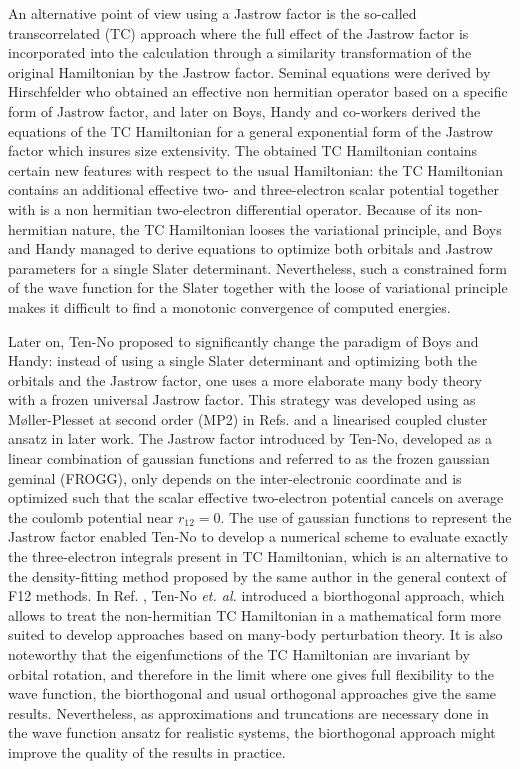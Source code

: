 \documentclass[aip,jcp,reprint,noshowkeys,superscriptaddress,twocolumn]{revtex4-1}
\begin{document}
An alternative point of view using a Jastrow factor is the so-called transcorrelated (TC) approach where the full effect of the Jastrow factor is incorporated into the calculation through a similarity transformation of the original Hamiltonian by the Jastrow factor. 
Seminal equations were derived by Hirschfelder\cite{Hirschfelder-JCP-63} who obtained an effective non hermitian operator based on a specific form of Jastrow factor, and later on Boys, Handy and co-workers\cite{BoyHan-PRSLA-69,BoyHanLin-1-PRSLA-69,BoyHanLin-2-PRSLA-69} derived the equations of the TC Hamiltonian for a general exponential form of the Jastrow factor which insures size extensivity. 
The obtained TC Hamiltonian contains certain new features with respect to the usual Hamiltonian: the TC Hamiltonian contains an additional effective two- and three-electron scalar potential together with is a non hermitian two-electron differential operator. Because of its non-hermitian nature, the TC Hamiltonian looses the variational principle, and Boys and Handy managed to derive equations to optimize both orbitals and Jastrow parameters for a single Slater determinant. 
Nevertheless, such a constrained form of the wave function for the Slater together with the loose of variational principle makes it difficult to find a monotonic convergence of computed energies\cite{Handy-MolPhys-71}. 

Later on, Ten-No\cite{TenNo-CPL-00-a} proposed to significantly change the paradigm of Boys and Handy: instead of using a single Slater determinant and optimizing both the orbitals and the Jastrow factor, one uses a more elaborate many body theory with a frozen universal Jastrow factor.  This strategy was developed using as M{\o}ller-Plesset at second order (MP2) in Refs.  and a linearised coupled cluster ansatz in later work\cite{HinTanTen-CPL-02}.  
The Jastrow factor introduced by Ten-No, developed as a linear combination of gaussian functions and referred to as the frozen gaussian geminal (FROGG), only depends on the inter-electronic coordinate and is optimized such that the scalar effective two-electron  potential cancels on average the coulomb potential near $r_{12}=0$. The use of gaussian functions to represent the Jastrow factor enabled Ten-No to develop a numerical scheme to evaluate exactly the three-electron integrals present in TC Hamiltonian\cite{TenNo-CPL-00-b}, which is an alternative to the density-fitting method proposed by the same author in the general context of F12 methods\cite{TenMan-JCP-03}. 
In Ref. , Ten-No \textit{et. al.} introduced a biorthogonal approach, 
which allows to treat the non-hermitian TC Hamiltonian in a mathematical form more suited 
to develop approaches based on many-body perturbation theory. 
It is also noteworthy that the eigenfunctions of the TC Hamiltonian are invariant by orbital rotation, 
and therefore in the limit where one gives full flexibility to the wave function, 
the biorthogonal and usual orthogonal approaches give the same results. 
Nevertheless, as approximations and truncations are necessary done in the wave function ansatz for realistic systems, 
the biorthogonal approach might improve the quality of the results in practice. 
\end{document}
